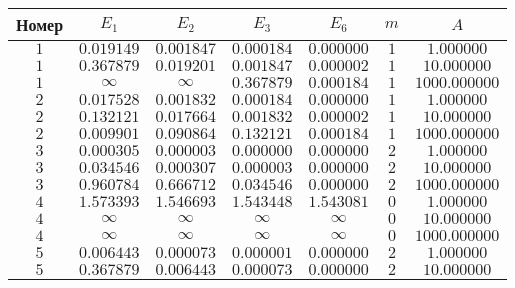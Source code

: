  \begin{table}[h!] 
\begin{center} 
\begin{tabular}{|c|c|c|c|c|c|c|} 
\hline 
Номер  & $E_1$ & $E_2$ & $E_3$ & $E_6$ & $m$ & $A$ \\ \hline
 $1$ &  $0.019149$ & $0.001847$ & $0.000184$ & $0.000000$ & $1$ & $1.000000$ \\ \hline 

 $1$ &  $0.367879$ & $0.019201$ & $0.001847$ & $0.000002$ & $1$ & $10.000000$ \\ \hline 

 $1$ &  $\infty$ & $\infty$ & $0.367879$ & $0.000184$ & $1$ & $1000.000000$ \\ \hline 

 $2$ &  $0.017528$ & $0.001832$ & $0.000184$ & $0.000000$ & $1$ & $1.000000$ \\ \hline 

 $2$ &  $0.132121$ & $0.017664$ & $0.001832$ & $0.000002$ & $1$ & $10.000000$ \\ \hline 

 $2$ &  $0.009901$ & $0.090864$ & $0.132121$ & $0.000184$ & $1$ & $1000.000000$ \\ \hline 

 $3$ &  $0.000305$ & $0.000003$ & $0.000000$ & $0.000000$ & $2$ & $1.000000$ \\ \hline 

 $3$ &  $0.034546$ & $0.000307$ & $0.000003$ & $0.000000$ & $2$ & $10.000000$ \\ \hline 

 $3$ &  $0.960784$ & $0.666712$ & $0.034546$ & $0.000000$ & $2$ & $1000.000000$ \\ \hline 

 $4$ &  $1.573393$ & $1.546693$ & $1.543448$ & $1.543081$ & $0$ & $1.000000$ \\ \hline 

 $4$ &  $\infty$ & $\infty$ & $\infty$ & $\infty$ & $0$ & $10.000000$ \\ \hline 

 $4$ &  $\infty$ & $\infty$ & $\infty$ & $\infty$ & $0$ & $1000.000000$ \\ \hline 

 $5$ &  $0.006443$ & $0.000073$ & $0.000001$ & $0.000000$ & $2$ & $1.000000$ \\ \hline 

 $5$ &  $0.367879$ & $0.006443$ & $0.000073$ & $0.000000$ & $2$ & $10.000000$ \\ \hline 


\end{tabular}
\end{center}
\end{table}
